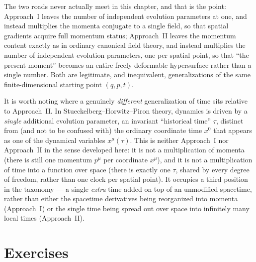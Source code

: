 \documentclass[11pt]{book}
\theoremstyle{definition}
\theoremstyle{remark}
\begin{document}
The two roads never actually meet in this chapter, and that is the point: Approach~I leaves the number of independent evolution parameters at one, and instead multiplies the momenta conjugate to a single field, so that spatial gradients acquire full momentum status; Approach~II leaves the momentum content exactly as in ordinary canonical field theory, and instead multiplies the number of independent evolution parameters, one per spatial point, so that ``the present moment'' becomes an entire freely-deformable hypersurface rather than a single number. Both are legitimate, and inequivalent, generalizations of the same finite-dimensional starting point $(q,p,t)$.

It is worth noting where a genuinely \emph{different} generalization of time sits relative to Approach~II. In Stueckelberg--Horwitz--Piron theory, dynamics is driven by a \emph{single} additional evolution parameter, an invariant ``historical time'' $\tau$, distinct from (and not to be confused with) the ordinary coordinate time $x^0$ that appears as one of the dynamical variables $x^\mu(\tau)$. This is neither Approach~I nor Approach~II in the sense developed here: it is not a multiplication of momenta (there is still one momentum $p^\mu$ per coordinate $x^\mu$), and it is not a multiplication of time into a function over space (there is exactly one $\tau$, shared by every degree of freedom, rather than one clock per spatial point). It occupies a third position in the taxonomy --- a single \emph{extra} time added on top of an unmodified spacetime, rather than either the spacetime derivatives being reorganized into momenta (Approach~I) or the single time being spread out over space into infinitely many local times (Approach~II).

\section*{Exercises}
\end{document}
